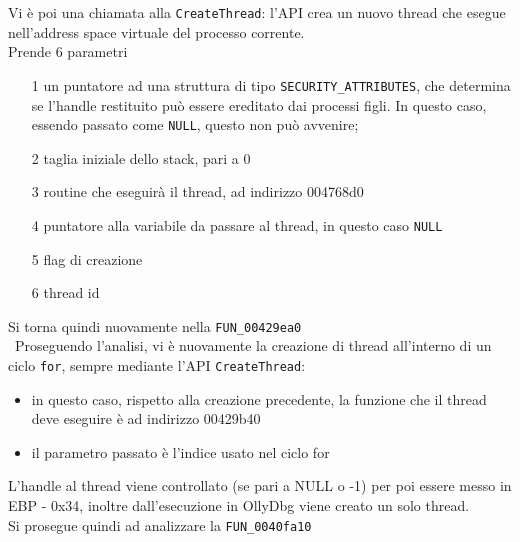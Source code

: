 \documentclass[12pt]{extarticle}
\begin{document}
Vi è poi una chiamata alla \texttt{CreateThread}: l'API crea un nuovo thread che esegue nell'address space virtuale del processo corrente.\\Prende 6 parametri 
\begin{itemize}
    \item[1] un puntatore ad una struttura di tipo \texttt{SECURITY\_ATTRIBUTES}, che determina se l'handle restituito può essere ereditato dai processi figli. In questo caso, essendo passato come \texttt{NULL}, questo non può avvenire;
    \item[2] taglia iniziale dello stack, pari a 0
    \item[3] routine che eseguirà il thread, ad indirizzo 004768d0
    \item[4] puntatore alla variabile da passare al thread, in questo caso \texttt{NULL} 
    \item[5] flag di creazione
    \item[6] thread id
\end{itemize}
Si torna quindi nuovamente nella \texttt{FUN\_00429ea0}\\\
Proseguendo l'analisi, vi è nuovamente la creazione di thread all'interno di un ciclo \texttt{for}, sempre mediante l'API \texttt{CreateThread}:
\begin{itemize}
    \item in questo caso, rispetto alla creazione precedente, la funzione che il thread deve eseguire è ad indirizzo 00429b40
    \item il parametro passato è l'indice usato nel ciclo for
\end{itemize}

L'handle al thread viene controllato (se pari a NULL o -1) per poi essere messo in EBP - 0x34, inoltre dall'esecuzione in OllyDbg viene creato un solo thread.\\Si prosegue quindi ad analizzare la \texttt{FUN\_0040fa10}
\end{document}

